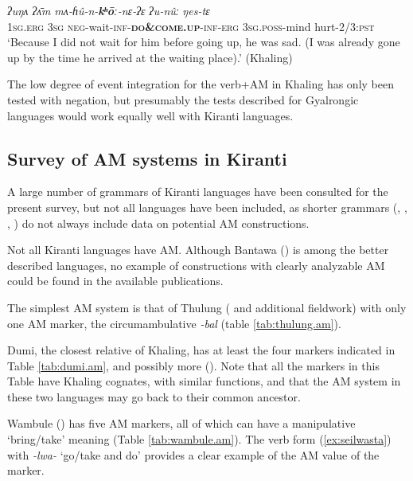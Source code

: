 \documentclass[oneside,a4paper,11pt]{article}
\newcommand{\ipa}[1]{{\phon\textit{#1}}}
\newcommand{\rouge}[1]{\textbf{#1}}
\begin{document}
\begin{exe}
\ex \label{ex:mahunkhonya}
 \gll
\ipa{ʔuŋʌ} \ipa{ʔʌ̄m} \ipa{mʌ-ɦû-n-\rouge{kʰōː}-nɛ-ʔɛ} \ipa{ʔu-nûː} \ipa{ŋes-tɛ} \\
\textsc{1sg}.\textsc{erg} \textsc{3sg} \textsc{neg}-wait-\textsc{inf}-\rouge{\textsc{do\&come.up}}-\textsc{inf}-\textsc{erg} \textsc{3sg}.\textsc{poss}-mind hurt-2/3:\textsc{pst} \\
\glt `Because I did not wait for him before going up, he was sad. (I was already gone up by the time he arrived at the waiting place).'  (Khaling)
\end{exe}

 

The low degree of event integration for the verb+AM in Khaling has only been tested with negation, but presumably the tests described for Gyalrongic languages would work equally well with Kiranti languages.

\subsection{Survey of AM systems in Kiranti}

A large number of grammars of Kiranti languages have been consulted for the present survey, but not all languages have been included, as shorter grammars  (\citealt{ebert97athpare}, \citealt{ebert97camling}, \citealt{opgenort05jero}, \citealt{tolsma06kulung}) do not always include data on potential AM constructions. 

Not all Kiranti languages have AM. Although Bantawa (\citealt{doornenbal09}) is among the better described languages, no example of constructions with clearly analyzable AM could be found in the available publications.

The simplest AM system is that of Thulung (\citealt{lahaussois02thulung} and additional fieldwork) with only one AM marker, the circumambulative \ipa{-bal} (table \ref{tab:thulung.am}).

Dumi, the closest relative of Khaling, has at least the four markers indicated in Table \ref{tab:dumi.am}, and possibly more (\citealt[199-214]{driem93dumi}). Note that all the markers in this Table have Khaling cognates, with similar functions, and that the AM system in these two languages may go back to their common ancestor.

Wambule (\citealt{opgenort04wambule}) has five AM markers, all of which can have a manipulative `bring/take' meaning (Table   \ref{tab:wambule.am}). The verb form (\ref{ex:seilwasta}) with  \ipa{-lwa-} `go/take and do' provides a clear example of the AM value of the marker.
 
\end{document}
